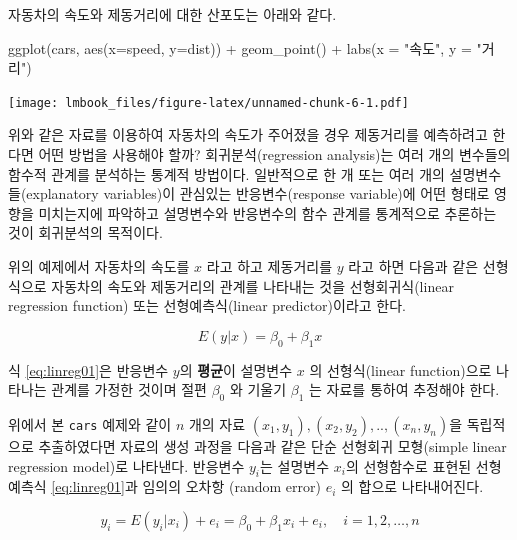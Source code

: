 \documentclass[
  10pt,
]{book}
\newenvironment{Shaded}{\begin{snugshade}}{\end{snugshade}}
\newcommand{\AttributeTok}[1]{\textcolor[rgb]{0.77,0.63,0.00}{#1}}
\newcommand{\FunctionTok}[1]{\textcolor[rgb]{0.00,0.00,0.00}{#1}}
\newcommand{\NormalTok}[1]{#1}
\newcommand{\SpecialCharTok}[1]{\textcolor[rgb]{0.00,0.00,0.00}{#1}}
\newcommand{\StringTok}[1]{\textcolor[rgb]{0.31,0.60,0.02}{#1}}
\theoremstyle{definition}
\theoremstyle{definition}
\theoremstyle{definition}
\theoremstyle{definition}
\theoremstyle{remark}
\begin{document}
자동차의 속도와 제동거리에 대한 산포도는 아래와 같다.

\begin{Shaded}
\begin{Highlighting}[]
\FunctionTok{ggplot}\NormalTok{(cars, }\FunctionTok{aes}\NormalTok{(}\AttributeTok{x=}\NormalTok{speed, }\AttributeTok{y=}\NormalTok{dist)) }\SpecialCharTok{+} \FunctionTok{geom\_point}\NormalTok{() }\SpecialCharTok{+} \FunctionTok{labs}\NormalTok{(}\AttributeTok{x =} \StringTok{"속도"}\NormalTok{, }\AttributeTok{y =} \StringTok{"거리"}\NormalTok{)}
\end{Highlighting}
\end{Shaded}

\texttt{[image: lmbook\_files/figure-latex/unnamed-chunk-6-1.pdf]}

위와 같은 자료를 이용하여 자동차의 속도가 주어졌을 경우 제동거리를
예측하려고 한다면 어떤 방법을 사용해야 할까? 회귀분석(regression
analysis)는 여러 개의 변수들의 함수적 관계를 분석하는 통계적 방법이다.
일반적으로 한 개 또는 여러 개의 설명변수들(explanatory variables)이
관심있는 반응변수(response variable)에 어떤 형태로 영향을 미치는지에
파악하고 설명변수와 반응변수의 함수 관계를 통계적으로 추론하는 것이
회귀분석의 목적이다.

위의 예제에서 자동차의 속도를 \(x\) 라고 하고 제동거리를 \(y\) 라고 하면
다음과 같은 선형식으로 자동차의 속도와 제동거리의 관계를 나타내는 것을
선형회귀식(linear regression function) 또는 선형예측식(linear
predictor)이라고 한다.

\begin{equation} 
E(y|x) = \beta_0 + \beta_1 x
\label{eq:linreg01}
\end{equation}

식 \eqref{eq:linreg01}은 반응변수 \(y\)의 \textbf{평균}이 설명변수 \(x\) 의
선형식(linear function)으로 나타나는 관계를 가정한 것이며 절편 \(\beta_0\)
와 기울기 \(\beta_1\) 는 자료를 통하여 추정해야 한다.

위에서 본 \texttt{cars} 예제와 같이 \(n\) 개의 자료
\((x_1,y_1),(x_2,y_2),..,(x_n, y_n)\)을 독립적으로 추출하였다면 자료의
생성 과정을 다음과 같은 단순 선형회귀 모형(simple linear regression
model)로 나타낸다. 반응변수 \(y_i\)는 설명변수 \(x_i\)의 선형함수로 표현된
선형 예측식 \eqref{eq:linreg01}과 임의의 오차항 (random error) \(e_i\) 의
합으로 나타내어진다.

\begin{equation} 
y_i = E(y_i | x_i) + e_i = \beta_0 + \beta_1 x_i + e_i, \quad i=1,2,\dots,n
\label{eq:linreg02}
\end{equation}
\end{document}

